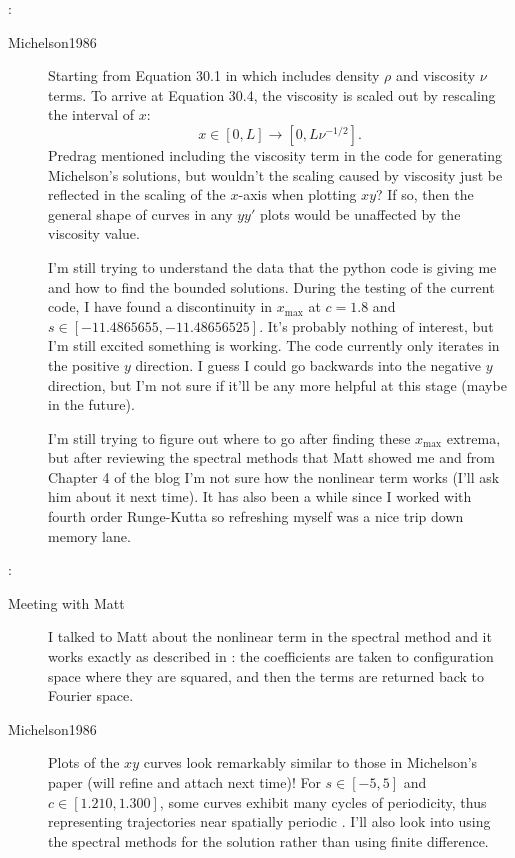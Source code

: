 \begin{description}
{\begin{description}
\end{description}
}

{ :
\begin{description}
\item[Michelson1986]
Starting from Equation 30.1 in 
which includes density $\rho$ and viscosity $\nu$ terms. To arrive at Equation 30.4, the
viscosity is scaled out by rescaling the interval of $x$:
\begin{equation}
    x \in [0,L] \to [0,L \nu^{-1/2}].
\end{equation}
Predrag mentioned including the viscosity term in the code for generating Michelson's
solutions, but wouldn't the scaling caused by viscosity just be reflected in the scaling
of the $x$-axis when plotting $xy$? If so, then the general shape of curves in any
$yy'$ plots would be unaffected by the viscosity value.

I'm still trying to understand the data that the python code is giving me and how to find
the bounded solutions. During the testing of the current code, I have found a discontinuity
in $x_{\text{max}}$ at $c=1.8$ and $s \in [-11.4865655,-11.48656525]$. It's probably
nothing of interest, but I'm still excited something is working. The code currently only
iterates in the positive $y$ direction. I guess I could go backwards into the negative $y$
direction, but I'm not sure if it'll be any more helpful at this stage (maybe in the
future).

I'm still trying to figure out where to go after finding these $x_{\text{max}}$ extrema,
but after reviewing the spectral methods that Matt showed me and from Chapter 4 of the blog
I'm not sure how the nonlinear term works (I'll ask him about it next time). It has also
been a while since I worked with fourth order Runge-Kutta so refreshing myself was a
nice trip down memory lane.

\end{description}
}

{ :
\begin{description}
\item[Meeting with Matt]
I talked to Matt about the nonlinear term in the spectral method and it works exactly
as described in : the coefficients
are taken to configuration space where they are squared, and then the terms are returned
back to Fourier space.

\item[Michelson1986]
Plots of the $xy$ curves look remarkably similar to those in Michelson's
paper (will refine and attach next time)! For $s \in [-5,5]$ and $c \in
[1.210,1.300]$, some curves exhibit many cycles of periodicity, thus
representing trajectories near spatially periodic \eqva. I'll also look into
using the spectral methods for the solution rather than using finite
difference.


\end{description}}
\end{description}
